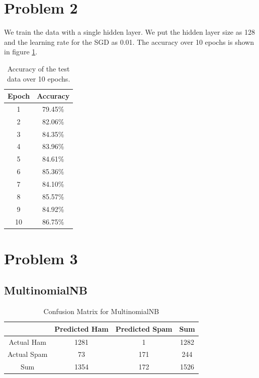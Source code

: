 \documentclass[a4paper]{article}
\begin{document}
\section*{Problem 2}
We train the data with a single hidden layer. We put the hidden layer size as 128 and the learning rate for the SGD as 0.01. The accuracy over 10 epochs is shown in figure \ref{tab}.
\begin{table}[h!]
	\centering
	
	\begin{tabular}{|c|c|}
		\hline
		Epoch & Accuracy \\
		\hline
		1 & 79.45\% \\
		\hline
		2 & 82.06\% \\
		\hline
		3 &  84.35\%\\
		\hline
		4 &  83.96\%\\
		\hline
		5 &  84.61\%\\
		\hline
		6 &  85.36\%\\
		\hline
		7 &  84.10\%\\
		\hline
		8 &  85.57\%\\
		\hline
		9 &  84.92\%\\
		\hline
		10 &  86.75\%\\
		\hline
	\end{tabular}
	\caption{Accuracy of the test data over 10 epochs. }
	\label{tab}
\end{table}

\section*{Problem 3}

\subsection*{MultinomialNB}

\begin{table}[h!]
    \centering
    \begin{tabular}{|c|c|c|c|}
        \hline
        & Predicted Ham & Predicted Spam & Sum \\
        \hline
        Actual Ham & 1281 & 1 & 1282 \\
        \hline
        Actual Spam & 73 & 171 & 244 \\
        \hline
        Sum & 1354 & 172 & 1526 \\
        \hline
    \end{tabular}
    \caption{Confusion Matrix for MultinomialNB}
    \label{mNB}
\end{table}
\end{document}
